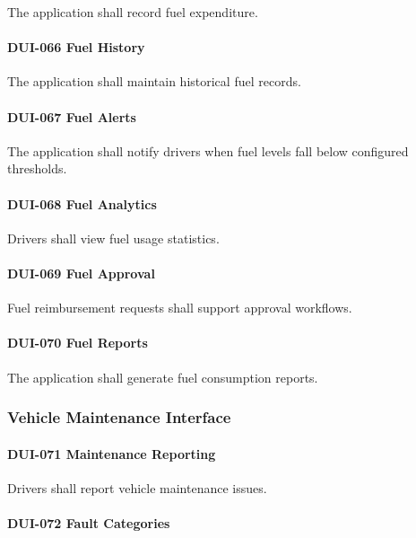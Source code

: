 The application shall record fuel expenditure.

\paragraph{DUI-066 Fuel History}

The application shall maintain historical fuel records.

\paragraph{DUI-067 Fuel Alerts}

The application shall notify drivers when fuel levels fall below
configured thresholds.

\paragraph{DUI-068 Fuel Analytics}

Drivers shall view fuel usage statistics.

\paragraph{DUI-069 Fuel Approval}

Fuel reimbursement requests shall support approval workflows.

\paragraph{DUI-070 Fuel Reports}

The application shall generate fuel consumption reports.


\subsubsection*{Vehicle Maintenance Interface}

\paragraph{DUI-071 Maintenance Reporting}

Drivers shall report vehicle maintenance issues.

\paragraph{DUI-072 Fault Categories}

